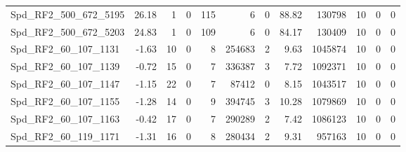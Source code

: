 \begin{longtable}[c]{@{}lrrrrrrrrrrr@{}}
Spd\_RF2\_500\_672\_5195      & 26.18                  & 1                       & 0                       & 115                    & 6                       & 0                       & 88.82                   & 130798                   & 10                       & 0                        & 0                        \\
Spd\_RF2\_500\_672\_5203      & 24.83                  & 1                       & 0                       & 109                    & 6                       & 0                       & 84.17                   & 130409                   & 10                       & 0                        & 0                        \\
Spd\_RF2\_60\_107\_1131       & -1.63                  & 10                      & 0                       & 8                      & 254683                  & 2                       & 9.63                    & 1045874                  & 10                       & 0                        & 0                        \\
Spd\_RF2\_60\_107\_1139       & -0.72                  & 15                      & 0                       & 7                      & 336387                  & 3                       & 7.72                    & 1092371                  & 10                       & 0                        & 0                        \\
Spd\_RF2\_60\_107\_1147       & -1.15                  & 22                      & 0                       & 7                      & 87412                   & 0                       & 8.15                    & 1043517                  & 10                       & 0                        & 0                        \\
Spd\_RF2\_60\_107\_1155       & -1.28                  & 14                      & 0                       & 9                      & 394745                  & 3                       & 10.28                   & 1079869                  & 10                       & 0                        & 0                        \\
Spd\_RF2\_60\_107\_1163       & -0.42                  & 17                      & 0                       & 7                      & 290289                  & 2                       & 7.42                    & 1086123                  & 10                       & 0                        & 0                        \\
Spd\_RF2\_60\_119\_1171       & -1.31                  & 16                      & 0                       & 8                      & 280434                  & 2                       & 9.31                    & 957163                   & 10                       & 0                        & 0                        \\

\end{longtable}
